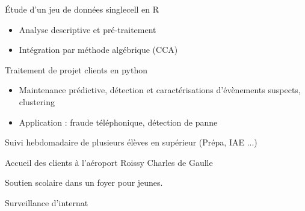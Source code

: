 \documentclass[10pt,a4paper]{CV/fonteCV}
\begin{document}
\divider

\'Etude d'un jeu de données singlecell en R
\smallskip%
\begin{itemize}
\item Analyse descriptive et pr\'e-traitement 
\item Intégration par méthode algébrique (CCA) 
\end{itemize}
\smallskip

\divider

Traitement de projet clients en python
\smallskip
\begin{itemize}
\item Maintenance prédictive, détection et caractérisations d'évènements suspects, clustering
\item Application : fraude téléphonique, détection de panne
\end{itemize}
\vspace{0.25cm}


   Suivi hebdomadaire de plusieurs élèves en supérieur (Prépa, IAE ...) 

\vspace{0.25cm}


   Accueil des clients à l'aéroport Roissy Charles de Gaulle

\vspace{0.25cm}

Soutien scolaire dans un foyer pour jeunes.

\vspace{0.25cm}

 Surveillance d'internat
\end{document}
